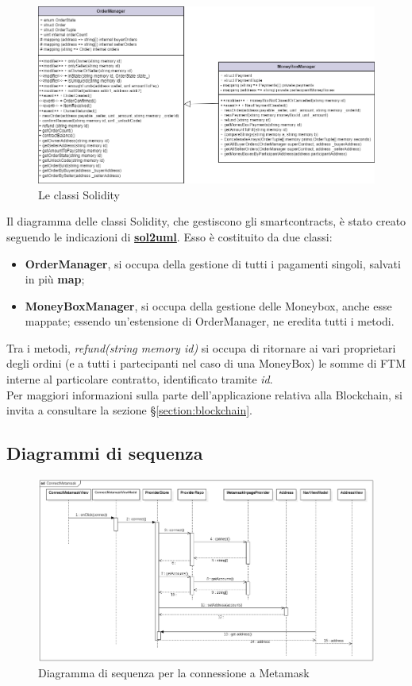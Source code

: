 \begin{figure}[H]
    \centering
    \includegraphics[scale = 0.45]{immagini/smartcontract.png}
    \caption{Le classi Solidity}
\end{figure}

Il diagramma delle classi Solidity, che gestiscono gli smartcontracts, è stato creato seguendo le indicazioni di \href{https://github.com/naddison36/sol2uml}{\textbf{sol2uml}}.
Esso è costituito da due classi:
\begin{itemize}
    \item \textbf{OrderManager}, si occupa della gestione di tutti i pagamenti singoli, salvati in più \textbf{map};
    \item \textbf{MoneyBoxManager}, si occupa della gestione delle Moneybox, anche esse mappate; essendo un'estensione di OrderManager, ne eredita tutti i metodi.
\end{itemize}
Tra i metodi, \textit{refund(string memory id)} si occupa di ritornare ai vari proprietari degli ordini 
(e a tutti i partecipanti nel caso di una MoneyBox) le somme di FTM interne al particolare contratto, identificato tramite \textit{id}.
\\
Per maggiori informazioni sulla parte dell'applicazione relativa alla Blockchain, si invita a consultare la sezione §\ref{section:blockchain}.



\subsection{Diagrammi di sequenza}

\begin{figure}[H]
    \centering
    \includegraphics[scale = 0.45]{immagini/diagrammaMeta.png}
    \caption{Diagramma di sequenza per la connessione a Metamask}
\end{figure}


